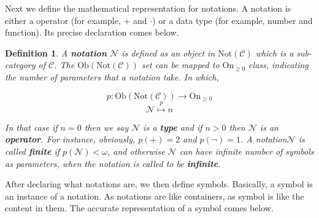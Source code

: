 \documentclass{article}
\newtheorem{definition}{Definition}	%
\numberwithin{theorem}{section}	%
\numberwithin{axiom}{section}	%
\numberwithin{definition}{section}	%
\begin{document}
Next we define the mathematical representation for notations. A notation is either a operator (for example, \(+\) and \(\cdot\)) or a data type (for example, number and function). Its precise declaration comes below.

\begin{definition}
	A \textbf{ notation} \(\mathcal{N}\) is defined as an object in \(\text{Not}(\mathcal{C})\) which is a sub-category of \(\mathcal{C}\). The \(\text{Ob}(\text{Not}(\mathcal{C}))\) set can be mapped to \(\text{On}_{\geq 0}\) class, indicating the number of parameters that a notation take. In which,
	
	\[\mathit{p}:\text{Ob}(\text{Not}(\mathcal{C}))\to \text{On}_{\geq 0}\]
	\[\mathcal{N}\overset{\mathit{p}}{\mapsto }n\]
	
	In that case if \(n=0\) then we say \(\mathcal{N}\) is a \textbf{ type} and if \(n>0\) then \(\mathcal{N}\) is an \textbf{ operator}. For instance, obviously, \(\mathit{p}(+)=2\) and \(\mathit{p}(\neg )=1\). A notation\(\mathcal{N}\) is called \textbf{ finite} if \(\mathit{p}(\mathcal{N})<\omega\), and otherwise \(\mathcal{N}\) can have infinite number of symbols as parameters, when the notation is called to be \textbf{ infinite}.
\end{definition}

After declaring what notations are, we then define symbols. Basically, a symbol is an instance of a notation. As notations are like containers, as symbol is like the content in them. The accurate representation of a symbol comes below.
\end{document}
